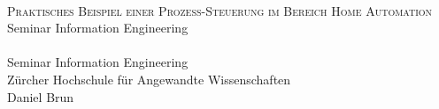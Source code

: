 




\begin{titlepage}
   \mbox{}\vspace{5\baselineskip}\\
   \rmfamily\huge
   \centering
   \textsc{Praktisches Beispiel einer Prozess-Steuerung im Bereich Home Automation} \\[2ex]
   Seminar Information Engineering
   \rmfamily\Large
   \vspace{1\baselineskip}\\
   \vhCurrentVersion\mbox{}
   \vspace{3\baselineskip}\\
   Seminar Information Engineering\\
   Zürcher Hochschule für Angewandte Wissenschaften
   \vspace{5\baselineskip}\\
   \rmfamily\Large
   Daniel Brun
   \vspace{1\baselineskip}\\
   \vhCurrentDate
\end{titlepage}
 



% 
